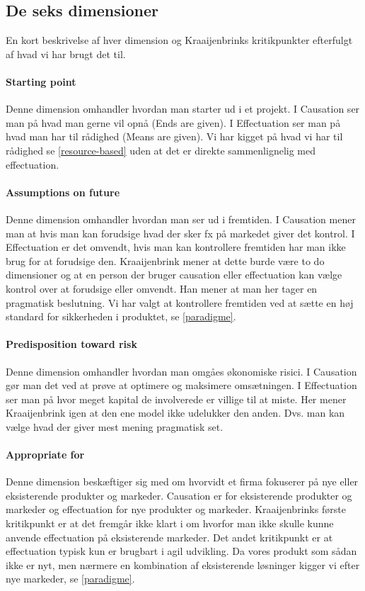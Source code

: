 \subsection{De seks dimensioner}
En kort beskrivelse af hver dimension og Kraaijenbrinks kritikpunkter efterfulgt af hvad vi har brugt det til.

\paragraph{Starting point}
Denne dimension omhandler hvordan man starter ud i et projekt.
I Causation ser man på hvad man gerne vil opnå (Ends are given).
I Effectuation ser man på hvad man har til rådighed (Means are given).
Vi har kigget på hvad vi har til rådighed se \cref{resource-based} uden at det er direkte sammenlignelig med effectuation.

\paragraph{Assumptions on future}
Denne dimension omhandler hvordan man ser ud i fremtiden.
I Causation mener man at hvis man kan forudsige hvad der sker fx på markedet giver det kontrol.
I Effectuation er det omvendt, hvis man kan kontrollere fremtiden har man ikke brug for at forudsige den.
Kraaijenbrink mener at dette burde være to do dimensioner og at en person der bruger causation eller effectuation kan vælge kontrol over at forudsige eller omvendt.
Han mener at man her tager en pragmatisk beslutning.
Vi har valgt at kontrollere fremtiden ved at sætte en høj standard for sikkerheden i produktet, se \cref{paradigme}.

\paragraph{Predisposition toward risk}
Denne dimension omhandler hvordan man omgåes økonomiske risici.
I Causation gør man det ved at prøve at optimere og maksimere omsætningen.
I Effectuation ser man på hvor meget kapital de involverede er villige til at miste.
Her mener Kraaijenbrink igen at den ene model ikke udelukker den anden.
Dvs. man kan vælge hvad der giver mest mening pragmatisk set.

\paragraph{Appropriate for}
Denne dimension beskæftiger sig med om hvorvidt et firma fokuserer på nye eller eksisterende produkter og markeder.
Causation er for eksisterende produkter og markeder og effectuation for nye produkter og markeder.
Kraaijenbrinks første kritikpunkt er at det fremgår ikke klart i \citet{sarasvathy2001effectuation} om hvorfor man ikke skulle kunne anvende effectuation på eksisterende markeder.
Det andet kritikpunkt er at effectuation typisk kun er brugbart i agil udvikling.
Da vores produkt som sådan ikke er nyt, men nærmere en kombination af eksisterende løsninger kigger vi efter nye markeder, se \cref{paradigme}.

